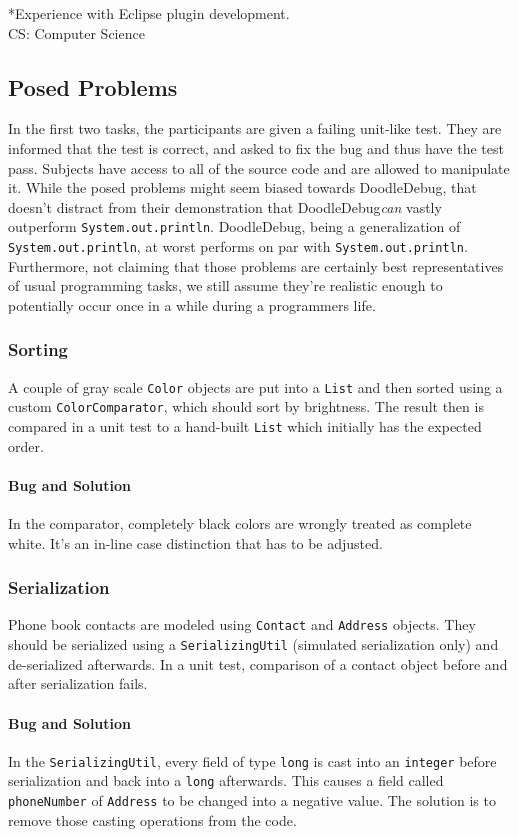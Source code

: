 \documentclass[english]{scrartcl}
\newcommand{\DD}{Dood\-le\-De\-bug\xspace}
\newcommand{\println}{\texttt{Sys\-tem.\-out.\-println}\xspace}
\begin{document}
*Experience with Eclipse plugin development. \\
CS: Computer Science

\subsection{Posed Problems}
In the first two tasks, the participants are given a failing unit-like test. They are informed that the test is correct, and asked to fix the bug and thus have the test pass. Subjects have access to all of the source code and are allowed to manipulate it.
While the posed problems might seem biased towards \DD, that doesn't distract from their demonstration that \DD \emph{can} vastly outperform \println. \DD, being a generalization of \println, at worst performs on par with \println.
Furthermore, not claiming that those problems are certainly best representatives of usual programming tasks, we still assume they're realistic enough to potentially occur once in a while during a programmers life.

\subsubsection{Sorting}
A couple of gray scale \texttt{Color} objects are put into a \texttt{List}
and then sorted using a custom \texttt{ColorComparator}, which should sort by brightness.
The result then is compared in a unit test to a hand-built \texttt{List} which initially has the expected order.

\paragraph{Bug and Solution}
In the comparator, completely black colors are wrongly treated as complete white.
It's an in-line case distinction that has to be adjusted.

\subsubsection{Serialization}
Phone book contacts are modeled using \texttt{Con\-tact} and \texttt{Address}  objects.
They should be serialized using a \texttt{Ser\-ializ\-ing\-Util} (simulated serialization only) and de-serialized afterwards.
In a unit test, comparison of a contact object before and after serialization fails.\\

\paragraph{Bug and Solution}
In the \texttt{SerializingUtil}, every field of type \texttt{long} is cast %
into an \texttt{integer} before serialization and back into a \texttt{long} afterwards.
This causes a field called \texttt{phoneNumber} of \texttt{Address} to be changed into a negative value.
The solution is to remove those casting operations from the code.
\end{document}
